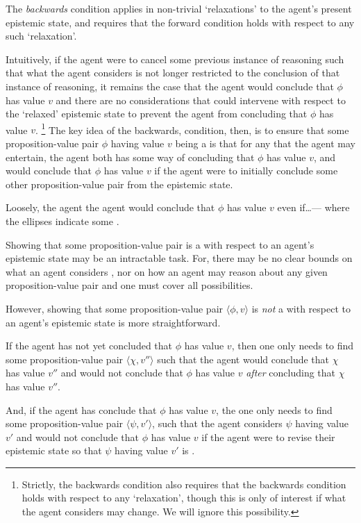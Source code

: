\begin{note}[Backwards]
  The \emph{backwards} condition applies in non-trivial `relaxations' to the agent's present epistemic state, and requires that the forward condition holds with respect to any such `relaxation'.

  Intuitively, if the agent were to cancel some previous instance of reasoning such that what the agent considers \epVAd{} is not longer restricted to the conclusion of that instance of reasoning, it remains the case that the agent would conclude that \(\phi\) has value \(v\) and there are no considerations that could intervene with respect to the `relaxed' epistemic state to prevent the agent from concluding that \(\phi\) has value \(v\).\nolinebreak
  \footnote{
    Strictly, the backwards condition also requires that the backwards condition holds with respect to any `relaxation', though this is only of interest if what the agent considers \epPAd{} may change.
    We will ignore this possibility.
  }
  The key idea of the backwards, condition, then, is to ensure that some proposition-value pair \(\phi\) having value \(v\) being a \sink{} is that for any \epPN{} that the agent may entertain, the agent both has some way of concluding that \(\phi\) has value \(v\), and would conclude that \(\phi\) has value \(v\) if the agent were to initially conclude some other proposition-value pair from the epistemic state.

  Loosely, the agent the agent would conclude that \(\phi\) has value \(v\) even if\dots\space --- where the ellipses indicate some \epPN{}.
\end{note}

\begin{note}
  Showing that some proposition-value pair is a \sink{} with respect to an agent's epistemic state may be an intractable task.
  For, there may be no clear bounds on what an agent considers \epPAd{}, nor on how an agent may reason about any given proposition-value pair and one must cover all possibilities.

  However, showing that some proposition-value pair \(\langle \phi,v \rangle\) is \emph{not} a \sink{} with respect to an agent's epistemic state is more straightforward.

  If the agent has not yet concluded that \(\phi\) has value \(v\), then one only needs to find some proposition-value pair \(\langle \chi,v'' \rangle\) such that the agent would conclude that \(\chi\) has value \(v''\) and would not conclude that \(\phi\) has value \(v\) \emph{after} concluding that \(\chi\) has value \(v''\).

  And, if the agent has conclude that \(\phi\) has value \(v\), the one only needs to find some proposition-value pair \(\langle \psi,v' \rangle\), such that the agent considers \(\psi\) having value \(v'\) \epPAd{} and would not conclude that \(\phi\) has value \(v\) if the agent were to revise their epistemic state so that \(\psi\) having value \(v'\) is \epVAd{}.
\end{note}

